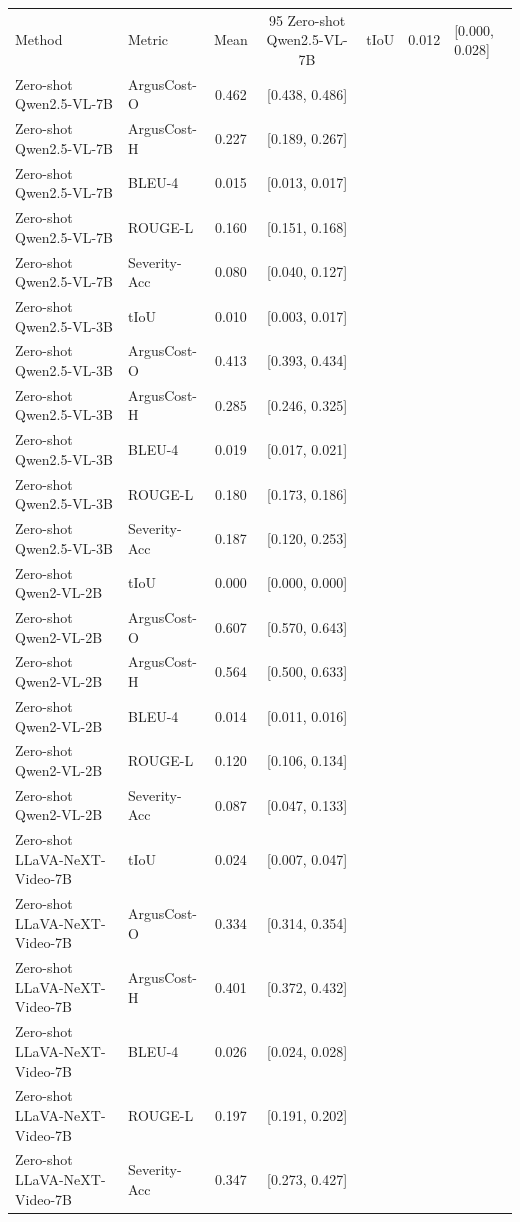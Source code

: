 \begin{tabular}{l l c c}
\toprule
Method & Metric & Mean & 95%
\midrule
Zero-shot Qwen2.5-VL-7B & tIoU & 0.012 & [0.000, 0.028] \\
Zero-shot Qwen2.5-VL-7B & ArgusCost-O & 0.462 & [0.438, 0.486] \\
Zero-shot Qwen2.5-VL-7B & ArgusCost-H & 0.227 & [0.189, 0.267] \\
Zero-shot Qwen2.5-VL-7B & BLEU-4 & 0.015 & [0.013, 0.017] \\
Zero-shot Qwen2.5-VL-7B & ROUGE-L & 0.160 & [0.151, 0.168] \\
Zero-shot Qwen2.5-VL-7B & Severity-Acc & 0.080 & [0.040, 0.127] \\
Zero-shot Qwen2.5-VL-3B & tIoU & 0.010 & [0.003, 0.017] \\
Zero-shot Qwen2.5-VL-3B & ArgusCost-O & 0.413 & [0.393, 0.434] \\
Zero-shot Qwen2.5-VL-3B & ArgusCost-H & 0.285 & [0.246, 0.325] \\
Zero-shot Qwen2.5-VL-3B & BLEU-4 & 0.019 & [0.017, 0.021] \\
Zero-shot Qwen2.5-VL-3B & ROUGE-L & 0.180 & [0.173, 0.186] \\
Zero-shot Qwen2.5-VL-3B & Severity-Acc & 0.187 & [0.120, 0.253] \\
Zero-shot Qwen2-VL-2B & tIoU & 0.000 & [0.000, 0.000] \\
Zero-shot Qwen2-VL-2B & ArgusCost-O & 0.607 & [0.570, 0.643] \\
Zero-shot Qwen2-VL-2B & ArgusCost-H & 0.564 & [0.500, 0.633] \\
Zero-shot Qwen2-VL-2B & BLEU-4 & 0.014 & [0.011, 0.016] \\
Zero-shot Qwen2-VL-2B & ROUGE-L & 0.120 & [0.106, 0.134] \\
Zero-shot Qwen2-VL-2B & Severity-Acc & 0.087 & [0.047, 0.133] \\
Zero-shot LLaVA-NeXT-Video-7B & tIoU & 0.024 & [0.007, 0.047] \\
Zero-shot LLaVA-NeXT-Video-7B & ArgusCost-O & 0.334 & [0.314, 0.354] \\
Zero-shot LLaVA-NeXT-Video-7B & ArgusCost-H & 0.401 & [0.372, 0.432] \\
Zero-shot LLaVA-NeXT-Video-7B & BLEU-4 & 0.026 & [0.024, 0.028] \\
Zero-shot LLaVA-NeXT-Video-7B & ROUGE-L & 0.197 & [0.191, 0.202] \\
Zero-shot LLaVA-NeXT-Video-7B & Severity-Acc & 0.347 & [0.273, 0.427] \\

\end{tabular}
